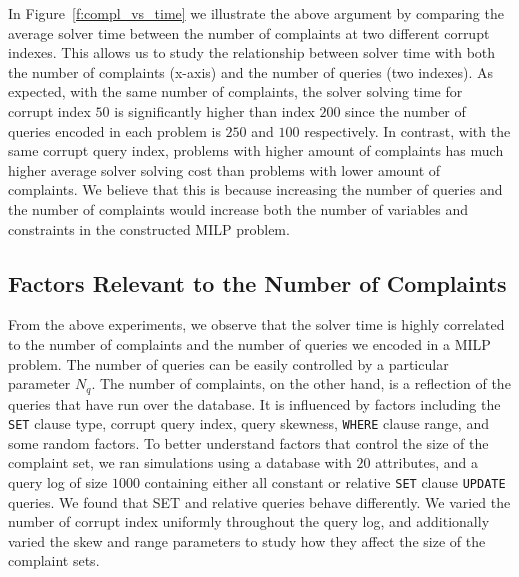 In Figure~\ref{f:compl_vs_time} we illustrate the above argument by comparing the average solver time between the number of complaints at two different corrupt indexes. This allows us to study the relationship between solver time with both the number of complaints (x-axis) and the number of queries (two indexes). As expected, with the same number of complaints, the solver solving time for corrupt index $50$ is significantly higher than index $200$ since the number of queries encoded in each problem is $250$ and $100$ respectively. In contrast, with the same corrupt query index, problems with higher amount of complaints has much higher average solver solving cost than problems with lower amount of complaints. We believe that this is because increasing the number of queries and the number of complaints would increase both the number of variables and constraints in the constructed MILP problem. 


\subsection{Factors Relevant to the Number of Complaints}

From the above experiments, we observe that the solver time is highly correlated to the number of complaints and the number of queries we encoded in a MILP problem. The number of queries can be easily controlled by a particular parameter $N_q$. The number of complaints, on the other hand, is a reflection of the queries that have run over the database. It is influenced by  factors including the \texttt{SET} clause type, corrupt query index, query skewness, \texttt{WHERE} clause range, and some random factors.   To better understand factors that control the size of the complaint set, we ran simulations using a database with $20$ attributes, and a query log of size $1000$ containing
either all constant or relative \texttt{SET} clause \texttt{UPDATE} queries. We found that SET and relative queries behave differently.
We varied the number of corrupt index uniformly throughout the query log, and additionally varied
the skew and range parameters to study how they affect the size of the complaint sets.



